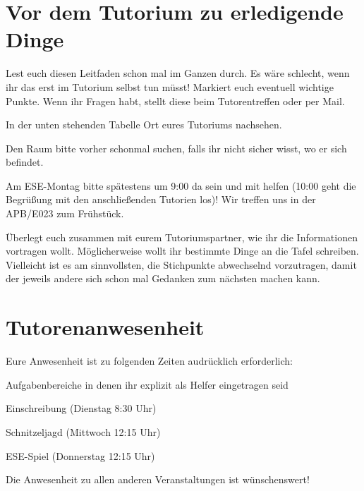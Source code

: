 \documentclass[a4paper,12pt]{report}
\begin{document}
\section{Vor dem Tutorium zu erledigende Dinge}
\begin{itemize*}
\item Lest euch diesen Leitfaden schon mal im Ganzen durch.
Es wäre schlecht, wenn ihr das erst im Tutorium selbst tun müsst!
Markiert euch eventuell wichtige Punkte.
Wenn ihr Fragen habt, stellt diese beim Tutorentreffen oder per Mail.
\item In der unten stehenden Tabelle Ort eures Tutoriums nachsehen.
\item Den Raum bitte vorher schonmal suchen, falls ihr nicht sicher wisst, wo er sich befindet.
\item Am ESE-Montag bitte spätestens um 9:00 da sein und mit helfen (10:00 geht die Begrüßung mit den anschließenden Tutorien los)!
Wir treffen uns in der APB/E023 zum Frühstück.
\item Überlegt euch zusammen mit eurem Tutoriumspartner, wie ihr die Informationen vortragen wollt.
Möglicherweise wollt ihr bestimmte Dinge an die Tafel schreiben.
Vielleicht ist es am sinnvollsten, die Stichpunkte abwechselnd vorzutragen, damit der jeweils andere sich schon mal Gedanken zum nächsten machen kann.
\end{itemize*}

\section{Tutorenanwesenheit}
Eure Anwesenheit ist zu folgenden Zeiten audrücklich erforderlich:
\begin{itemize*}
\item Aufgabenbereiche in denen ihr explizit als Helfer eingetragen seid
\item Einschreibung (Dienstag 8:30 Uhr)
\item Schnitzeljagd (Mittwoch 12:15 Uhr)
\item ESE-Spiel (Donnerstag 12:15 Uhr)
\end{itemize*}
Die Anwesenheit zu allen anderen Veranstaltungen ist wünschenswert!
\end{document}
